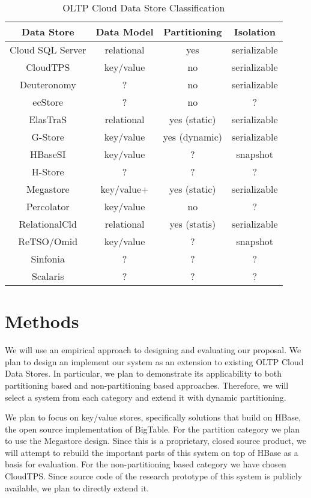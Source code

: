 \documentclass[10pt,final,journal]{IEEEtran}
\begin{document}
\begin{table}[!t]
\renewcommand{\arraystretch}{1.3}
\caption{OLTP Cloud Data Store Classification}
\label{classification}
\centering
\begin{tabular}{|c|c|c|c|}
\hline
\bfseries Data Store  & \bfseries Data Model & \bfseries  Partitioning & \bfseries Isolation \\
\hline
\hline
Cloud SQL Server & relational & yes & serializable \\
CloudTPS & key/value & no & serializable \\
Deuteronomy & ? & no &serializable \\
ecStore & ? & no & ? \\
ElasTraS & relational & yes (static) & serializable \\
G-Store & key/value & yes (dynamic) & serializable \\
HBaseSI & key/value & ? & snapshot \\
H-Store & ? & ? & ? \\
Megastore & key/value+ & yes (static) & serializable \\
Percolator & key/value & no & ? \\
RelationalCld & relational & yes (statis) & serializable \\
ReTSO/Omid & key/value & ? & snapshot \\
Sinfonia & ? & ? & ? \\
Scalaris & ? & ? & ? \\
\hline
\end{tabular}
\end{table}





\section{Methods}
We will use an empirical approach to designing and evaluating our proposal. We plan to design an implement our system as an extension to existing OLTP Cloud Data Stores. In particular, we plan to demonstrate its applicability to both partitioning based and non-partitioning based approaches. Therefore, we will select a system from each category and extend it with dynamic partitioning.

We plan to focus on key/value stores, specifically solutions that build on HBase, the open source implementation of BigTable. For the partition category we plan to use the Megastore design. Since this is a proprietary, closed source product, we will attempt to rebuild the important parts of this system on top of HBase as a basis for evaluation. For the non-partitioning based category we have chosen CloudTPS. Since source code of the research prototype of this system is publicly available, we plan to directly extend it.
\end{document}
